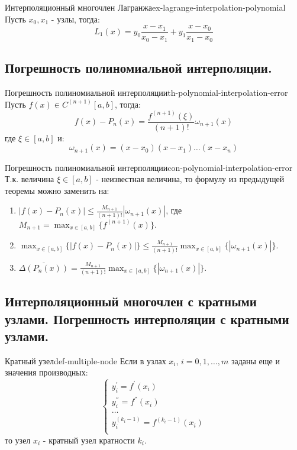 \documentclass[14pt]{extarticle}
\begin{document}
    \begin{example}{Интерполяционный многочлен Лагранжа}{ex-lagrange-interpolation-polynomial}
        Пусть $x_{0}, x_{1}$ - узлы, тогда:
        $$L_{1}(x) = y_{0}\frac{x - x_{1}}{x_{0} - x_{1}} + y_{1}\frac{x - x_{0}}{x_{1} - x_{0}}$$
    \end{example}

\clearpage
\subsection{Погрешность полиномиальной интерполяции.}

    \begin{theorem}{Погрешность полиномиальной интерполяции}{th-polynomial-interpolation-error}
        Пусть $f(x) \in C^{(n+1)}[a, b]$, тогда:
        $$f(x) - P_{n}(x) = \frac{f^{(n + 1)}(\xi)}{(n + 1)!}\omega_{n+1}(x)$$
        где $\xi \in [a, b]$ и:
        $$\omega_{n+1}(x) = (x - x_{0})(x - x_{1}) \ldots (x-x_{n})$$
    \end{theorem}

    \begin{consequence}{Погрешность полиномиальной интерполяции}{con-polynomial-interpolation-error}
        Т.к. величина $\xi \in [a, b]$ - неизвестная величина, то формулу из предыдущей теоремы можно заменить на:
        \begin{enumerate}
            \item $|f(x) - P_{n}(x)| \leq \frac{M_{n+1}}{(n+1)!}|\omega_{n+1}(x)|$, где $M_{n+1} = \max_{x \in [a, b]}\{f^{(n+1)}(x)\}$.\\
            \item $\max_{x \in [a, b]}\{|f(x) - P_{n}(x)|\} \leq \frac{M_{n+1}}{(n+1)!}\max_{x \in [a, b]}\{|\omega_{n+1}(x)|\}$.\\
            \item $\overline{\Delta(P_{n}(x))} = \frac{M_{n+1}}{(n+1)!}\max_{x \in [a, b]}\{|\omega_{n+1}(x)|\}$.\\
        \end{enumerate}
    \end{consequence}

\clearpage
\subsection{Интерполяционный многочлен с кратными узлами. Погрешность интерполяции с кратными узлами.}

    \begin{definition}{Кратный узел}{def-multiple-node}
        Если в узлах $x_{i}$, $i = 0, 1, \ldots, m$ заданы еще и значения производных: 
        $$
        \begin{cases}
            y_{i}^{'} = f^{'}(x_{i})\\ 
            y_{i}^{''} = f^{''}(x_{i})\\
            \ldots\\
            y_{i}^{(k_{i} - 1)} = f^{(k_{i} - 1)}(x_{i})\\
        \end{cases}
        $$ 
        то узел $x_{i}$ - кратный узел кратности $k_{i}$.
    \end{definition}
\end{document}
